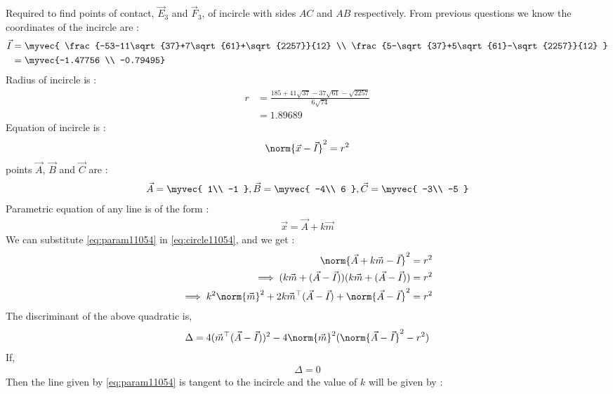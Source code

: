 \documentclass[journal,12pt,twocolumn]{IEEEtran}
\theoremstyle{remark}
\begin{document}
Required to find points of contact, $\vec{E}_3$ and $\vec{F}_3$, of incircle with sides $AC$ and $AB$ respectively.
From previous questions we know the coordinates of the incircle are : 
\begin{align}
	\vec{I} &= 
	\myvec {
		\frac{-53-11\sqrt{37}+7\sqrt{61}+\sqrt{2257}}{12} \\ 
		\frac{5-\sqrt{37}+5\sqrt{61}-\sqrt{2257}}{12}
	} \\
	&= \myvec{-1.47756 \\ -0.79495}
\end{align}
Radius of incircle is :
    \begin{align}
		r &= \frac{185+41\sqrt{37}-37\sqrt{61}-\sqrt{2257}}{6\sqrt{74}} \\
		&= 1.89689
	\end{align}
Equation of incircle is : 
\begin{align}
	{\norm{ \vec{x}-\vec{I} }}^2 = {r}^2 \label{eq:circle11054}
\end{align}
points $\vec{A}$, $\vec{B}$ and $\vec{C}$ are : 
\begin{align}
	\vec{A} = \myvec{
		1\\
		-1
	}, 
	\vec{B} = \myvec{
		-4\\
		6
	}, 
	\vec{C} = \myvec{
		-3\\
		-5
	}
\end{align}
Parametric equation of any line is of the form :
\begin{align}
	\vec{x} = \vec{A} + k\vec{m} \label{eq:param11054}
\end{align}
We can substitute \eqref{eq:param11054} in \eqref{eq:circle11054}, and we get : 
\begin{align}
	{\norm{ \vec{A}+k\vec{m}-\vec{I} }}^2 &= {r}^2 \\
	\implies (k\vec{m} + (\vec{A} - \vec{I}))(k\vec{m} + (\vec{A} - \vec{I})) &= {r}^2 \\
	\implies k^2 \norm{\vec{m}}^2 + 2k\vec{m}^{\top} (\vec{A}-\vec{I}) + \norm{\vec{A}-\vec{I}}^2 &= {r}^2 
\end{align}
The discriminant of the above quadratic is,
\begin{align}
	\Delta = 4(\vec{m}^{\top}(\vec{A}-\vec{I}))^2 - 4\norm{\vec{m}}^2(\norm{\vec{A}-\vec{I}}^2 - r^2) \label{eq:Delta11054}
\end{align} 
If,
\begin{align}
	\Delta = 0
\end{align}
Then the line given by \eqref{eq:param11054} is tangent to the incircle and the value of $k$ will be given by :
\end{document}
